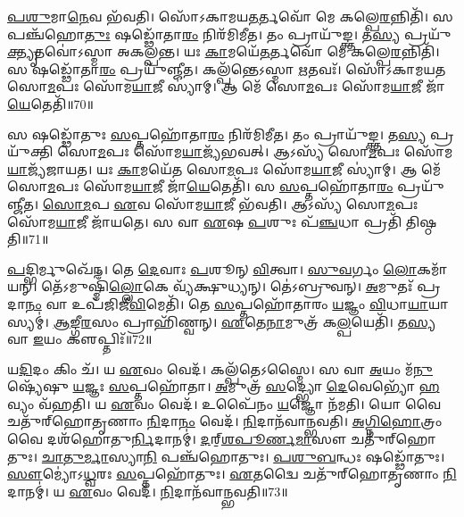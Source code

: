 \-\ul{𑌪}\-\-\ul{𑌶𑍁}\-𑌮𑌾\-\ul{𑌨𑍇}\-𑌵 𑌭᳴𑌵𑌤𑌿।
𑌸𑍋᳴𑌽𑌕𑌾𑌮𑌯\-\ul{𑌤}\-𑌰𑍍𑌤𑌵𑍋᳴ 𑌮𑍇 𑌕𑌲𑍍𑌪𑍇\-\ul{𑌰}\-𑌨𑍍𑌨𑌿𑌤𑌿᳴।
𑌸 𑌪𑌞𑍍𑌚᳴𑌹𑍋\-\ul{𑌤𑍁𑌃} 𑌷𑌡𑍍𑌢𑍋᳴𑌤𑌾\-\ul{𑌰𑌂} 𑌨𑌿𑌰᳴𑌮𑌿𑌮𑍀𑌤।
𑌤𑌂 𑌪𑍍𑌰𑌾𑌯𑍁᳴𑌙𑍍𑌕𑍍𑌤।
𑌤\-\ul{𑌸𑍍𑌯} 𑌪𑍍𑌰𑌯𑍁᳴\-\ul{𑌕𑍍𑌤𑍍𑌯𑍃}\-𑌤𑌵𑍋॑\-𑌽𑌸𑍍𑌮𑌾 𑌅𑌕𑌲𑍍𑌪𑌨𑍍𑌤।
𑌯𑌃 \ul{𑌕𑌾}\-𑌮𑌯𑍇᳴\-\ul{𑌤}\-𑌰𑍍𑌤𑌵𑍋᳴ 𑌮𑍇 𑌕𑌲𑍍𑌪𑍇\-\ul{𑌰}\-𑌨𑍍𑌨𑌿𑌤𑌿᳴।
𑌸 𑌷𑌡𑍍𑌢𑍋᳴𑌤𑌾\-\ul{𑌰𑌂} 𑌪𑍍𑌰𑌯𑍁᳴𑌞𑍍𑌜𑍀𑌤।
𑌕𑌲𑍍𑌪᳴𑌨𑍍𑌤𑍇\-𑌽𑌸𑍍𑌮𑌾 \ul{𑌋}\-𑌤𑌵𑌃᳴।
𑌸𑍋᳴𑌽𑌕𑌾𑌮𑌯𑌤 𑌸𑍋\-\ul{𑌮}\-𑌪𑌃 𑌸𑍋᳴𑌮\-\ul{𑌯𑌾}\-𑌜𑍀 𑌸𑍍𑌯𑌾॑𑌮𑍍।
𑌆 𑌮𑍇᳴ 𑌸𑍋\-\ul{𑌮}\-𑌪𑌃 𑌸𑍋᳴𑌮\-\ul{𑌯𑌾}\-𑌜𑍀 𑌜𑌾᳴\-\ul{𑌯𑍇}\-𑌤𑍇𑌤𑌿᳴॥70॥

𑌸 𑌷𑌡𑍍𑌢𑍋᳴𑌤𑍁𑌃 \ul{𑌸}\-𑌪𑍍𑌤𑌹𑍋᳴𑌤𑌾\-\ul{𑌰𑌂} 𑌨𑌿𑌰᳴𑌮𑌿𑌮𑍀𑌤।
𑌤𑌂 𑌪𑍍𑌰𑌾𑌯𑍁᳴𑌙𑍍𑌕𑍍𑌤।
𑌤\-\ul{𑌸𑍍𑌯} 𑌪𑍍𑌰𑌯𑍁᳴𑌕𑍍𑌤𑌿 𑌸𑍋\-\ul{𑌮}\-𑌪𑌃 𑌸𑍋᳴𑌮\-\ul{𑌯𑌾}\-𑌜𑍍𑌯᳴𑌭𑌵𑌤𑍍।
𑌆𑌽𑌸𑍍𑌯᳴ 𑌸𑍋\-\ul{𑌮}\-𑌪𑌃 𑌸𑍋᳴𑌮\-\ul{𑌯𑌾}\-𑌜𑍍𑌯᳴𑌜𑌾𑌯𑌤।
𑌯𑌃 \ul{𑌕𑌾}\-𑌮𑌯𑍇᳴𑌤 𑌸𑍋\-\ul{𑌮}\-𑌪𑌃 𑌸𑍋᳴𑌮\-\ul{𑌯𑌾}\-𑌜𑍀 𑌸𑍍𑌯𑌾॑𑌮𑍍।
𑌆 𑌮𑍇᳴ 𑌸𑍋\-\ul{𑌮}\-𑌪𑌃 𑌸𑍋᳴𑌮\-\ul{𑌯𑌾}\-𑌜𑍀 𑌜𑌾᳴\-\ul{𑌯𑍇}\-𑌤𑍇𑌤𑌿᳴।
𑌸 \ul{𑌸}\-𑌪𑍍𑌤𑌹𑍋᳴𑌤𑌾\-\ul{𑌰𑌂} 𑌪𑍍𑌰𑌯𑍁᳴𑌞𑍍𑌜𑍀𑌤।
\-\ul{𑌸𑍋}\-\-\ul{𑌮}\-𑌪 \ul{𑌏}\-𑌵 𑌸𑍋᳴𑌮\-\ul{𑌯𑌾}\-𑌜𑍀 𑌭᳴𑌵𑌤𑌿।
𑌆𑌽𑌸𑍍𑌯᳴ 𑌸𑍋\-\ul{𑌮}\-𑌪𑌃 𑌸𑍋᳴𑌮\-\ul{𑌯𑌾}\-𑌜𑍀 𑌜𑌾᳴𑌯𑌤𑍇।
𑌸 𑌵𑌾 \ul{𑌏}\-𑌷 \ul{𑌪}\-𑌶𑍁𑌃 𑌪᳴\-\ul{𑌞𑍍𑌚}\-𑌧𑌾 𑌪𑍍𑌰𑌤𑌿᳴ 𑌤𑌿𑌷𑍍𑌠𑌤𑌿॥71॥

\-\ul{𑌪}\-𑌦𑍍𑌭𑌿𑌰𑍍𑌮𑍁𑌖𑍇᳴𑌨।
𑌤𑍇 \ul{𑌦𑍇}\-𑌵𑌾𑌃 \ul{𑌪}\-𑌶𑍂𑌨𑍍 \ul{𑌵𑌿}\-𑌤𑍍𑌵𑌾।
\-\ul{𑌸𑍁}\-\-\ul{𑌵}\-𑌰𑍍𑌗𑌂 \ul{𑌲𑍋}\-𑌕𑌮𑌾᳴𑌯𑌨𑍍।
𑌤𑍇᳴𑌽𑌮𑍁𑌷𑍍𑌮𑌿𑌁᳴\-\ul{𑌲𑍍𑌲𑍋}\-𑌕𑍇 𑌵𑍍𑌯᳴𑌕𑍍𑌷𑍁𑌧𑍍𑌯𑌨𑍍।
𑌤𑍇॑𑌽𑌬𑍍𑌰𑍁𑌵𑌨𑍍।
\-\ul{𑌅}\-𑌮𑍁𑌤𑌃᳴ 𑌪𑍍𑌰𑌦𑌾\-\ul{𑌨𑌂} 𑌵𑌾 𑌉𑌪᳴𑌜𑌿𑌜𑍀\-\ul{𑌵𑌿}\-𑌮𑍇𑌤𑌿᳴।
𑌤𑍇 \ul{𑌸}\-𑌪𑍍𑌤𑌹𑍋᳴𑌤𑌾𑌰𑌂 \ul{𑌯}\-𑌜𑍍𑌞𑌂 \ul{𑌵𑌿}\-𑌧𑌾\-\ul{𑌯𑌾}\-𑌯𑌾𑌸𑍍𑌯𑌮𑍍॑।
\-\ul{𑌆}\-\-\ul{𑌙𑍍𑌗𑍀}\-\-\ul{𑌰}\-𑌸𑌂 𑌪𑍍𑌰𑌾𑌹𑌿᳴𑌣𑍍𑌵𑌨𑍍।
\-\ul{𑌏}\-𑌤𑍇\-\ul{𑌨𑌾}\-𑌮𑍁𑌤𑍍𑌰᳴ 𑌕\-\ul{𑌲𑍍𑌪}\-𑌯𑍇𑌤𑌿᳴।
𑌤\-\ul{𑌸𑍍𑌯} 𑌵𑌾 \ul{𑌇}\-𑌯𑌂 𑌕𑍢𑌪𑍍𑌤𑌿𑌃᳴॥72॥

𑌯\-\ul{𑌦𑌿}\-𑌦𑌂 𑌕𑌿𑌂 𑌚᳴।
𑌯 \ul{𑌏}\-𑌵𑌂 𑌵𑍇𑌦᳴।
𑌕𑌲𑍍𑌪᳴𑌤𑍇\-𑌽𑌸𑍍𑌮𑍈।
𑌸 𑌵𑌾 \ul{𑌅}\-𑌯𑌂 𑌮᳴\-\ul{𑌨𑍁}\-𑌷𑍍𑌯𑍇᳴𑌷𑍁 \ul{𑌯}\-𑌜𑍍𑌞𑌃 \ul{𑌸}\-𑌪𑍍𑌤𑌹𑍋᳴𑌤𑌾।
\-\ul{𑌅}\-𑌮𑍁𑌤𑍍𑌰᳴ \ul{𑌸}\-𑌦𑍍𑌭𑍍𑌯𑍋 \ul{𑌦𑍇}\-𑌵𑍇𑌭𑍍𑌯𑍋᳴ \ul{𑌹}\-𑌵𑍍𑌯𑌂 𑌵᳴𑌹𑌤𑌿।
𑌯 \ul{𑌏}\-𑌵𑌂 𑌵𑍇𑌦᳴।
𑌉𑌪𑍈᳴𑌨𑌂 \ul{𑌯}\-𑌜𑍍𑌞𑍋 𑌨᳴𑌮𑌤𑌿।
𑌯𑍋 𑌵𑍈 𑌚𑌤𑍁᳴𑌰𑍍‌\mbox{}𑌹𑍋𑌤𑍃𑌣𑌾𑌂 \ul{𑌨𑌿}\-𑌦𑌾\-\ul{𑌨𑌂} 𑌵𑍇𑌦᳴।
\-\ul{𑌨𑌿}\-𑌦𑌾𑌨᳴𑌵𑌾𑌨𑍍𑌭𑌵𑌤𑌿।
\-\ul{𑌅}\-\-\ul{𑌗𑍍𑌨𑌿}\-\-\ul{𑌹𑍋}\-𑌤𑍍𑌰𑌂 𑌵𑍈 𑌦𑌶᳴𑌹𑍋𑌤𑍁\-\ul{𑌰𑍍𑌨𑌿}\-𑌦𑌾𑌨𑌮𑍍॑।
\-\ul{𑌦}\-𑌰𑍍‌॒\mbox{}\-\ul{𑌶}\-\-\ul{𑌪𑍂}\-\-\ul{𑌰𑍍𑌣}\-\-\ul{𑌮𑌾}\-𑌸𑍗 𑌚𑌤𑍁᳴𑌰𑍍‌\mbox{}𑌹𑍋𑌤𑍁𑌃।
\-\ul{𑌚𑌾}\-\-\ul{𑌤𑍁}\-\-\ul{𑌰𑍍𑌮𑌾}\-𑌸𑍍𑌯𑌾\-\ul{𑌨𑌿} 𑌪𑌞𑍍𑌚᳴𑌹𑍋𑌤𑍁𑌃।
\-\ul{𑌪}\-\-\ul{𑌶𑍁}\-\-\ul{𑌬}\-𑌨𑍍𑌧𑌃 𑌷𑌡𑍍𑌢𑍋᳴𑌤𑍁𑌃।
\-\ul{𑌸𑍗}\-𑌮𑍍𑌯𑍋॑\-𑌽\-\ul{𑌧𑍍𑌵}\-𑌰𑌃 \ul{𑌸}\-𑌪𑍍𑌤𑌹𑍋᳴𑌤𑍁𑌃।
\-\ul{𑌏}\-𑌤𑌦𑍍𑌵𑍈 𑌚𑌤𑍁᳴𑌰𑍍‌\mbox{}𑌹𑍋𑌤𑍃𑌣𑌾𑌂 \ul{𑌨𑌿}\-𑌦𑌾𑌨𑌮𑍍॑।
𑌯 \ul{𑌏}\-𑌵𑌂 𑌵𑍇𑌦᳴।
\-\ul{𑌨𑌿}\-𑌦𑌾𑌨᳴𑌵𑌾𑌨𑍍𑌭𑌵𑌤𑌿॥73॥\anuvakamend[\-\ul{𑌅}\-\-\ul{𑌮𑌿}\-\-\ul{𑌮𑍀}\-\-\ul{𑌤} 𑌤𑌂 𑌪𑍍𑌰𑌾𑌯𑍁᳴\-\ul{𑌙𑍍𑌕𑍍𑌤} 𑌪𑌞𑍍𑌚᳴𑌹𑍋𑌤𑌾\-\ul{𑌰𑌂} 𑌪𑍍𑌰 𑌯𑍁᳴𑌞𑍍𑌜𑍀𑌤 𑌜𑌾\-\ul{𑌯𑍇}\-𑌤𑍇𑌤𑌿᳴ 𑌤𑌿𑌷𑍍𑌠\-\ul{𑌤𑌿} 𑌕𑍢\-\ul{𑌪𑍍𑌤𑌿}\-𑌰𑍍𑌦𑌶᳴𑌹𑍋𑌤𑍁\-\ul{𑌰𑍍𑌨𑌿}\-𑌦𑌾𑌨𑍞᳴ \ul{𑌸}\-𑌪𑍍𑌤 𑌚᳴]




